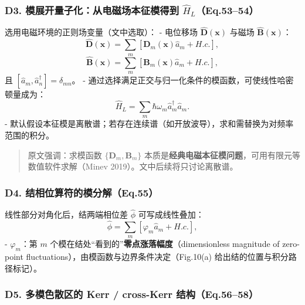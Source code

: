 \documentclass[12pt,a4paper,oneside]{ctexbook}
\begin{document}
\subsubsection{\texorpdfstring{\textbf{D3.
模展开量子化：从电磁场本征模得到
\(\hat H_L\)（Eq.53--54）}}{D3. 模展开量子化：从电磁场本征模得到 \textbackslash{}hat H\_L（Eq.53--54）}}\label{d3.-ux6a21ux5c55ux5f00ux91cfux5b50ux5316ux4eceux7535ux78c1ux573aux672cux5f81ux6a21ux5f97ux5230-hat-h_leq.5354}

选用电磁环境的正则场变量（文中选取）： - 电位移场
\(\hat{\mathbf D}(\mathbf x)\) 与磁场 \(\hat{\mathbf B}(\mathbf x)\)：
\[
\hat{\mathbf D}(\mathbf x)=\sum_m\left[\mathbf D_m(\mathbf x)\hat a_m+H.c.\right],
\tag{53a}
\] \[
\hat{\mathbf B}(\mathbf x)=\sum_m\left[\mathbf B_m(\mathbf x)\hat a_m+H.c.\right],
\tag{53b}
\] 且 \([\hat a_m,\hat a_n^\dagger]=\delta_{mn}\)。 -
通过选择满足正交与归一化条件的模函数，可使线性哈密顿量成为： \[
\hat H_L=\sum_m \hbar\omega_m \hat a_m^\dagger \hat a_m.
\tag{54}
\] -
默认假设本征模是离散谱；若存在连续谱（如开放波导），求和需替换为对频率范围的积分。

\begin{quote}
原文强调：求模函数 \(\{\mathbf D_m,\mathbf B_m\}\)
本质是\textbf{经典电磁本征模问题}，可用有限元等数值软件求解（Minev
2019）。文中后续将只讨论离散谱。
\end{quote}

\subsubsection{\texorpdfstring{\textbf{D4.
结相位算符的模分解（Eq.55）}}{D4. 结相位算符的模分解（Eq.55）}}\label{d4.-ux7ed3ux76f8ux4f4dux7b97ux7b26ux7684ux6a21ux5206ux89e3eq.55}

线性部分对角化后，结两端相位差 \(\hat\phi\) 可写成线性叠加： \[
\hat\phi=\sum_m\left[\varphi_m \hat a_m+H.c.\right],
\tag{55}
\] - \(\varphi_m\)：第 \(m\)
个模在结处``看到的''\textbf{零点涨落幅度}（dimensionless magnitude of
zero-point fluctuations），由模函数与边界条件决定（Fig.10(a)
给出结的位置与积分路径标记）。

\subsubsection{\texorpdfstring{\textbf{D5. 多模色散区的 Kerr /
cross-Kerr
结构（Eq.56--58）}}{D5. 多模色散区的 Kerr / cross-Kerr 结构（Eq.56--58）}}\label{d5.-ux591aux6a21ux8272ux6563ux533aux7684-kerr-cross-kerr-ux7ed3ux6784eq.5658}
\end{document}
